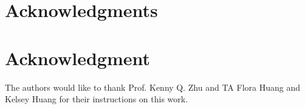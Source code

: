 \documentclass[10pt,journal,compsoc]{IEEEtran}
\begin{document}




\ifCLASSOPTIONcompsoc
  \section*{Acknowledgments}
\else
  \section*{Acknowledgment}
\fi


The authors would like to thank Prof. Kenny Q. Zhu and TA Flora Huang and Kelsey Huang for their instructions on this work.


\ifCLASSOPTIONcaptionsoff
  \newpage
\fi





%
%
%

\end{document}
